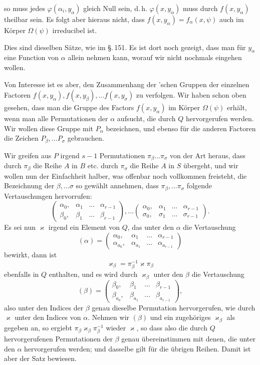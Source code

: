 so muss jedes $\varphi(\alpha_i, y_\alpha)$ gleich Null sein, d.\,h. $\varphi(x, y_\alpha)$ muss
durch $f(x, y_\alpha)$ theilbar sein. Es folgt aber hieraus nicht, dass
$f(x, y_\alpha) = f_\alpha(x, \psi)$ auch im K\"orper $\Omega(\psi)$ irreducibel ist.

Dies sind dieselben S\"atze, wie im \S.\,151. Es ist dort noch
gezeigt, dass man f\"ur $y_\alpha$ eine Function von $\alpha$ allein nehmen kann,
worauf wir nicht nochmals eingehen wollen.

Von Interesse ist es aber, den Zusammenhang der 'schen
Gruppen der einzelnen Factoren $f(x, y_\alpha), f(x, y_\beta), \ldots f(x, y_\sigma)$
zu verfolgen. Wir haben schon oben gesehen, dass man die
Gruppe des Factors $f(x, y_\alpha)$ im K\"orper $\Omega(\psi)$ erh\"alt, wenn man
alle Permutationen der $\alpha$ aufsucht, die durch $Q$ hervorgerufen
werden. Wir wollen diese Gruppe mit $P_\alpha$ bezeichnen, und ebenso
f\"ur die anderen Factoren die Zeichen $P_\beta, \ldots P_\sigma$ gebrauchen.

Wir greifen aus $P$ irgend $s - 1$ Permutationen $\pi_\beta \ldots \pi_\sigma$
von der Art heraus, dass durch $\pi_\beta$ die Reihe $A$ in $B$ etc.
durch $\pi_\sigma$ die Reihe $A$ in $S$ \"ubergeht, und wir wollen nun der
Einfachheit halber, was offenbar noch vollkommen freisteht, die
Bezeichnung der $\beta, \ldots \sigma$ so gew\"ahlt annehmen, dass $\pi_\beta, \ldots \pi_\sigma$
folgende Vertauschungen hervorrufen:
\[
\begin{pmatrix} \alpha_0, & \alpha_1 & \ldots & \alpha_{r-1} \\ \beta_0, & \beta_1 & \ldots & \beta_{r-1} \end{pmatrix}, \ldots
\begin{pmatrix} \alpha_0, & \alpha_1 & \ldots & \alpha_{r-1} \\ \sigma_0, & \sigma_1 & \ldots & \sigma_{r-1} \end{pmatrix}.
\]
Es sei nun $\varkappa$ irgend ein Element von $Q$, das unter den $\alpha$ die
Vertauschung
\[
(\alpha) = \begin{pmatrix} \alpha_0, & \alpha_1 & \ldots & \alpha_{r-1} \\ \alpha_{a_0}, & \alpha_{a_1} & \ldots & \alpha_{a_{r-1}} \end{pmatrix}
\]
bewirkt, dann ist
\[
\varkappa_\beta = \pi_\beta^{-1} \varkappa \pi_\beta
\]
ebenfalls in $Q$ enthalten, und es wird durch $\varkappa_\beta$ unter den $\beta$ die
Vertauschung
\[
(\beta) = \begin{pmatrix} \beta_0, & \beta_1 & \ldots & \beta_{r-1} \\ \beta_{a_0}, & \beta_{a_1} & \ldots & \beta_{a_{r-1}} \end{pmatrix},
\]
also unter den Indices der $\beta$ genau dieselbe Permutation hervorgerufen,
wie durch $\varkappa$ unter den Indices von $\alpha$. Nehmen wir
$(\beta)$ und ein zugeh\"origes $\varkappa_\beta$ als gegeben an, so ergiebt $\pi_\beta \varkappa_\beta \pi_\beta^{-1}$
wieder $\varkappa$, so dass also die durch $Q$ hervorgerufenen Permutationen
 der $\beta$ genau \"ubereinstimmen mit denen, die unter den
$\alpha$ hervorgerufen werden; und dasselbe gilt f\"ur die \"ubrigen
Reihen. Damit ist aber der Satz bewiesen.
